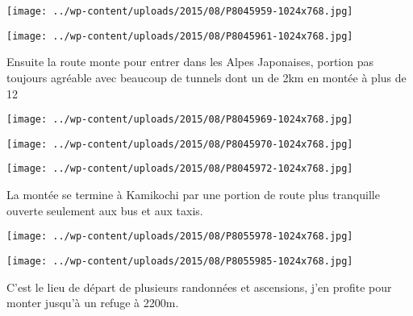 \begin{center} \texttt{[image: ../wp-content/uploads/2015/08/P8045959-1024x768.jpg]} \end{center}

 

 

\begin{center} \texttt{[image: ../wp-content/uploads/2015/08/P8045961-1024x768.jpg]} \end{center}

 

 Ensuite la route monte pour entrer dans les Alpes Japonaises, portion pas toujours agréable avec beaucoup de tunnels dont un de 2km en montée à plus de 12%

 

\begin{center} \texttt{[image: ../wp-content/uploads/2015/08/P8045969-1024x768.jpg]} \end{center}

 

 

\begin{center} \texttt{[image: ../wp-content/uploads/2015/08/P8045970-1024x768.jpg]} \end{center}

 

 

\begin{center} \texttt{[image: ../wp-content/uploads/2015/08/P8045972-1024x768.jpg]} \end{center}

 

 La montée se termine à Kamikochi par une portion de route plus tranquille ouverte seulement aux bus et aux taxis. 

 

\begin{center} \texttt{[image: ../wp-content/uploads/2015/08/P8055978-1024x768.jpg]} \end{center}

 

 

\begin{center} \texttt{[image: ../wp-content/uploads/2015/08/P8055985-1024x768.jpg]} \end{center}

 

 C'est le lieu de départ de plusieurs randonnées et ascensions, j'en profite pour monter jusqu'à un refuge à 2200m. 

